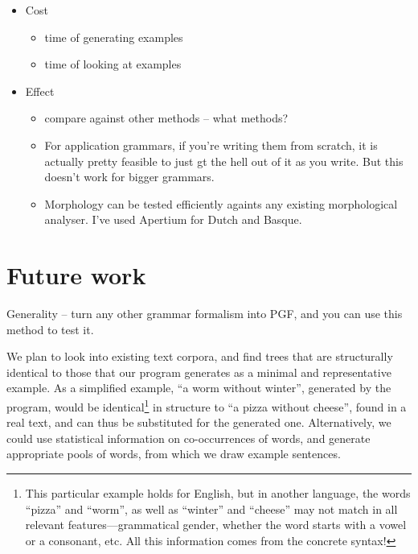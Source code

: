 \begin{itemize}
\item Cost
  \begin{itemize}
  \item time of generating examples
  \item time of looking at examples
  \end{itemize}

\item Effect
  \begin{itemize}
  \item compare against other methods -- what methods?
  \item For application grammars, if you're writing them from scratch, it is actually pretty feasible to just gt the hell out of it as you write. But this doesn't work for bigger grammars.
  \item Morphology can be tested efficiently againts any existing morphological analyser. I've used Apertium for Dutch and Basque.
  \end{itemize}
\end{itemize}


\section{Future work}


Generality -- turn any other grammar formalism into PGF, and you can use this method to test it.


We plan to look into existing text corpora, and find trees that are
structurally identical  to those that our program generates as a
minimal and representative example. As a simplified example, ``a worm
without winter'', generated by the program, would be identical\footnote{This particular example holds for English, but in another language, the words ``pizza'' and ``worm'', as well as ``winter'' and ``cheese'' may not match in all relevant features---grammatical gender, whether the word starts with a vowel or a consonant, etc. All this information comes from the concrete syntax!} 
in structure to ``a pizza without cheese'', found in a real text, and
can thus be substituted for the generated one.   
Alternatively, we could use statistical information on co-occurrences
of words, and generate appropriate pools of words, from which we draw
example sentences. 
